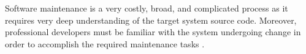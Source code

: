 Software maintenance is a very costly, broad, and complicated process 
as it requires very deep understanding of the target system source 
code. Moreover, professional
developers must be familiar with the system undergoing change in order to accomplish
the required maintenance tasks \cite{alhindawi_degree_nodate}. 

